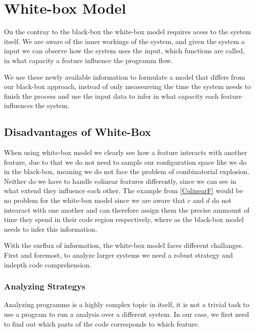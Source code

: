 \section{White-box Model}\label{ch:Whitebox}


On the contray to the black-box the white-box model requires acess to the system itself. 
We are aware of the inner workings of the system, and given the system a input we can observe how the system uses the input, which functions are called, 
in what capacity a feature influence the programm flow. 

We use these newly available information to formulate a model that differs from our black-box approach, instead of only meassureing the time the system
needs to finish the process and use the input data to infer in what capacity each feature influences the system. 

\subsection{Disadvantages of White-Box}
When using white-box model we clearly see how a feature interacts with another feature, due to that we do not need to sample our configuration space like
we do in the black-box, meaning we do not face the problem of combinatorial explosion. 
Neither do we have to handle colinear features differently, since we can see in what extend they influence each other. 
The example from \ref{ColinearF} would be no problem for the white-box model since we are aware that $c$ and $d$ do not intearact with one another and can
therefore assign them the precise ammount of time they spend in their code region respectively, where as the black-box model needs to infer this information.

With the surflux of information, the white-box model faces different challanges. 
First and foremost, to analyze larger systems we need a robust strategy and indepth code comprehension.

\subsubsection{Analyzing Strategys}
Analyzing programms is a highly complex topic in itself, it is not a trivial task to use a program to run a analysis over a different system.
In our case, we first need to find out which parts of the code corresponds to which feature.

